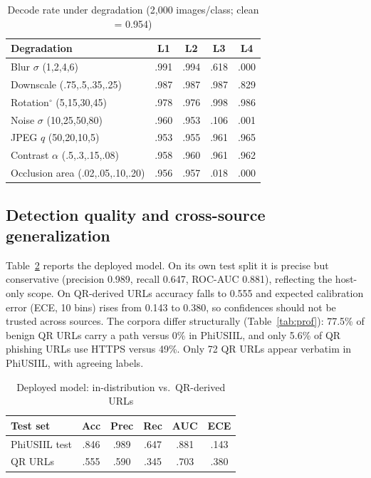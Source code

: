 \documentclass[conference]{IEEEtran}
\begin{document}
\begin{table}[t]
\caption{Decode rate under degradation (2{,}000 images/class; clean = 0.954)}
\label{tab:rob}
\centering
\small
\begin{tabular}{lcccc}
\toprule
Degradation & L1 & L2 & L3 & L4 \\
\midrule
Blur $\sigma$ (1,2,4,6) & .991 & .994 & .618 & .000 \\
Downscale (.75,.5,.35,.25) & .987 & .987 & .987 & .829 \\
Rotation$^\circ$ (5,15,30,45) & .978 & .976 & .998 & .986 \\
Noise $\sigma$ (10,25,50,80) & .960 & .953 & .106 & .001 \\
JPEG $q$ (50,20,10,5) & .953 & .955 & .961 & .965 \\
Contrast $\alpha$ (.5,.3,.15,.08) & .958 & .960 & .961 & .962 \\
Occlusion area (.02,.05,.10,.20) & .956 & .957 & .018 & .000 \\
\bottomrule
\end{tabular}
\end{table}

\subsection{Detection quality and cross-source generalization}
Table~\ref{tab:cur} reports the deployed model. On its own test split it is precise but conservative (precision 0.989, recall 0.647, ROC-AUC 0.881), reflecting the host-only scope. On QR-derived URLs accuracy falls to 0.555 and expected calibration error (ECE, 10 bins) rises from 0.143 to 0.380, so confidences should not be trusted across sources. The corpora differ structurally (Table~\ref{tab:prof}): 77.5\% of benign QR URLs carry a path versus 0\% in PhiUSIIL, and only 5.6\% of QR phishing URLs use HTTPS versus 49\%. Only 72 QR URLs appear verbatim in PhiUSIIL, with agreeing labels.

\begin{table}[t]
\caption{Deployed model: in-distribution vs.\ QR-derived URLs}
\label{tab:cur}
\centering
\small
\begin{tabular}{lccccc}
\toprule
Test set & Acc & Prec & Rec & AUC & ECE \\
\midrule
PhiUSIIL test & .846 & .989 & .647 & .881 & .143 \\
QR URLs & .555 & .590 & .345 & .703 & .380 \\
\bottomrule
\end{tabular}
\end{table}
\end{document}
